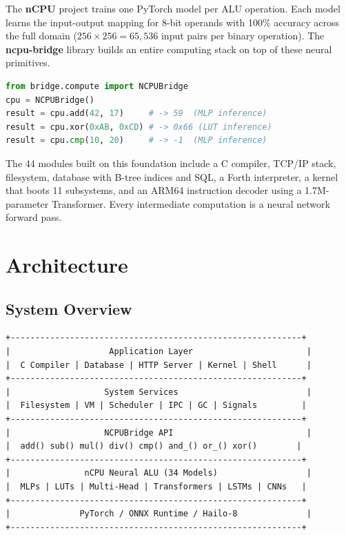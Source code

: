\documentclass[11pt,a4paper]{article}
\begin{document}
The \textbf{nCPU} project trains one PyTorch model per ALU operation. Each model learns the input-output mapping for 8-bit operands with 100\% accuracy across the full domain ($256 \times 256 = 65{,}536$ input pairs per binary operation). The \textbf{ncpu-bridge} library builds an entire computing stack on top of these neural primitives.

\begin{lstlisting}[language=Python]
from bridge.compute import NCPUBridge
cpu = NCPUBridge()
result = cpu.add(42, 17)     # -> 59  (MLP inference)
result = cpu.xor(0xAB, 0xCD) # -> 0x66 (LUT inference)
result = cpu.cmp(10, 20)     # -> -1  (MLP inference)
\end{lstlisting}

The 44 modules built on this foundation include a C compiler, TCP/IP stack, filesystem, database with B-tree indices and SQL, a Forth interpreter, a kernel that boots 11 subsystems, and an ARM64 instruction decoder using a 1.7M-parameter Transformer. Every intermediate computation is a neural network forward pass.

\section{Architecture}

\subsection{System Overview}

\begin{lstlisting}
+-----------------------------------------------------------+
|                    Application Layer                       |
|  C Compiler | Database | HTTP Server | Kernel | Shell      |
+-----------------------------------------------------------+
|                   System Services                          |
|  Filesystem | VM | Scheduler | IPC | GC | Signals         |
+-----------------------------------------------------------+
|                   NCPUBridge API                           |
|  add() sub() mul() div() cmp() and_() or_() xor()        |
+-----------------------------------------------------------+
|               nCPU Neural ALU (34 Models)                  |
|  MLPs | LUTs | Multi-Head | Transformers | LSTMs | CNNs   |
+-----------------------------------------------------------+
|              PyTorch / ONNX Runtime / Hailo-8              |
+-----------------------------------------------------------+
\end{lstlisting}
\end{document}
